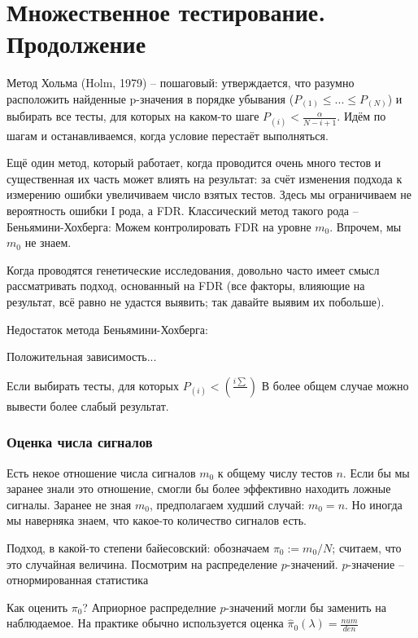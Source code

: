 \documentclass[main.tex]{subfiles}
\begin{document}
	
\section{Множественное тестирование. Продолжение}

Метод Хольма (Holm, 1979) -- пошаговый: утверждается, что разумно расположить найденные p-значения в порядке убывания ($ P_{(1)} \le ... \le P_{(N)} $) и выбирать все тесты, для которых на каком-то шаге $ P_{(i)} < \frac{\alpha}{N - i + 1} $.
Идём по шагам и останавливаемся, когда условие перестаёт выполняться.

Ещё один метод, который работает, когда проводится очень много тестов и существенная их часть может влиять на результат: за счёт изменения подхода к измерению ошибки увеличиваем число взятых тестов.
Здесь мы ограничиваем не вероятность ошибки I рода, а FDR.
Классический метод такого рода -- Беньямини-Хохберга:
Можем контролировать FDR на уровне $ m_0 $.
Впрочем, мы  $ m_0 $ не знаем.

Когда проводятся генетические исследования, довольно часто имеет смысл рассматривать подход, основанный на FDR (все факторы, влияющие на результат, всё равно не удастся выявить; так давайте выявим их побольше).

Недостаток метода Беньямини-Хохберга: %

Положительная зависимость...

Если выбирать тесты, для которых $ P_{(i)} < \left( \frac{i \sum }{} \right) $ %
В более общем случае можно вывести более слабый результат.

\subsubsection{Оценка числа сигналов}

Есть некое отношение числа сигналов $m_0$ к общему числу тестов $n$.
Если бы мы заранее знали это отношение, смогли бы более эффективно находить ложные сигналы.
Заранее не зная $m_0$,  предполагаем худший случай: $ m_0 = n $.
Но иногда мы наверняка знаем, что какое-то количество сигналов есть.

Подход, в какой-то степени байесовский: обозначаем $ \pi_0 := m_0 / N $; считаем, что это случайная величина.
Посмотрим на распределение  $p$-значений.
$p$-значение -- отнормированная статистика %

Как оценить $\pi_0$?
Априорное распределние $p$-значений могли бы заменить на наблюдаемое.
На практике обычно используется оценка $ \hat \pi_0(\lambda) = \frac{num}{den} $ %
\end{document}
